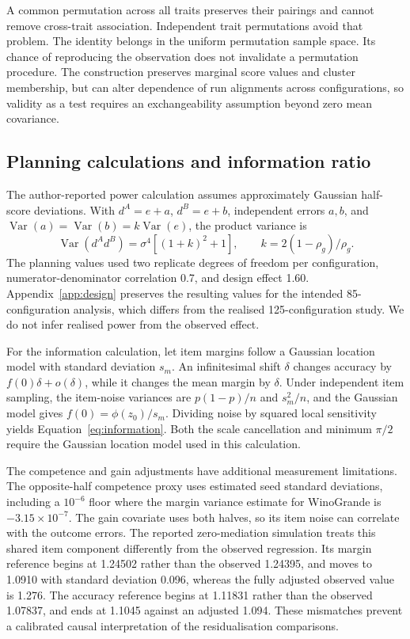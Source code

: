 A common permutation across all traits preserves their pairings and cannot remove cross-trait association. Independent trait permutations avoid that problem. The identity belongs in the uniform permutation sample space. Its chance of reproducing the observation does not invalidate a permutation procedure. The construction preserves marginal score values and cluster membership, but can alter dependence of run alignments across configurations, so validity as a test requires an exchangeability assumption beyond zero mean covariance.

\subsection{Planning calculations and information ratio}
The author-reported power calculation assumes approximately Gaussian half-score deviations. With $d^A=e+a$, $d^B=e+b$, independent errors $a,b$, and $\operatorname{Var}(a)=\operatorname{Var}(b)=k\operatorname{Var}(e)$, the product variance is
\begin{equation}
\operatorname{Var}(d^Ad^B)=\sigma^4[(1+k)^2+1],\qquad
k=2(1-\rho_g)/\rho_g.
\end{equation}
The planning values used two replicate degrees of freedom per configuration, numerator-denominator correlation 0.7, and design effect 1.60. Appendix~\ref{app:design} preserves the resulting values for the intended 85-configuration analysis, which differs from the realised 125-configuration study. We do not infer realised power from the observed effect.

For the information calculation, let item margins follow a Gaussian location model with standard deviation $s_m$. An infinitesimal shift $\delta$ changes accuracy by $f(0)\delta+o(\delta)$, while it changes the mean margin by $\delta$. Under independent item sampling, the item-noise variances are $p(1-p)/n$ and $s_m^2/n$, and the Gaussian model gives $f(0)=\phi(z_0)/s_m$. Dividing noise by squared local sensitivity yields Equation~\ref{eq:information}. Both the scale cancellation and minimum $\pi/2$ require the Gaussian location model used in this calculation.

The competence and gain adjustments have additional measurement limitations. The opposite-half competence proxy uses estimated seed standard deviations, including a $10^{-6}$ floor where the margin variance estimate for WinoGrande is $-3.15\times10^{-7}$. The gain covariate uses both halves, so its item noise can correlate with the outcome errors. The reported zero-mediation simulation treats this shared item component differently from the observed regression. Its margin reference begins at 1.24502 rather than the observed 1.24395, and moves to 1.0910 with standard deviation 0.096, whereas the fully adjusted observed value is 1.276. The accuracy reference begins at 1.11831 rather than the observed 1.07837, and ends at 1.1045 against an adjusted 1.094. These mismatches prevent a calibrated causal interpretation of the residualisation comparisons.

